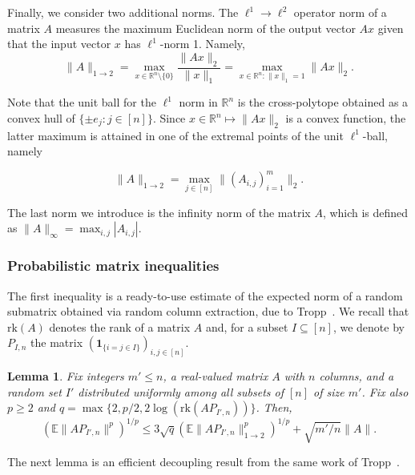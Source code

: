 \documentclass[reqno,a4paper]{amsart}
\newtheorem{lemma}[theorem]{Lemma}
\theoremstyle{definition}
\begin{document}
Finally, we consider two additional norms. The $\ell^1\to \ell^2$ operator norm of a matrix $A$ measures the maximum Euclidean norm of the output vector $Ax$ given that the input vector $x$ has $\ell^1$-norm 1. Namely,
\[\|A\|_{1 \to 2} = \max_{x \in \mathbb R^n\setminus \{0\}} \frac{\|Ax\|_2}{\|x\|_1} = \max_{x\in \mathbb R^n: \|x\|_1 = 1} \|Ax\|_2.\]

Note that the unit ball for the $\ell^1$ norm in $\mathbb R^n$ is the cross-polytope obtained as a convex hull of $\{\pm e_j\colon j\in [n]\}$. Since $x\in \mathbb R^n\mapsto \|Ax\|_2$ is a convex function, the latter maximum is attained in one of the extremal points of the unit $\ell^1$-ball, namely

\begin{equation}\label{eq:12}
\|A\|_{1 \to 2} = \max_{j\in [n]} \|(A_{i,j})_{i=1}^m\|_2.
\end{equation}

The last norm we introduce is the infinity norm of the matrix $A$, which is defined as $\|A\|_{\infty} = \max_{i,j} |A_{i,j}|$.

\subsubsection{Probabilistic matrix inequalities}
The first inequality is a ready-to-use estimate of the expected norm of a random submatrix obtained via random column extraction, due to Tropp~\cite[Theorem~23]{Tro08}.
We recall that $\text{rk}(A)$ denotes the rank of a matrix $A$ and, for a subset $I\subseteq [n]$, we denote by $P_{I,n}$ the matrix $(\mathbf{1}_{\{i=j\in I\}})_{i,j\in [n]}$.

\begin{lemma}\label{lem:compression}
Fix integers $m'\le n$, a real-valued matrix $A$ with $n$ columns, and a random set $I'$ distributed uniformly among all subsets of $[n]$ of size $m'$.
Fix also $p\ge2$ and $q=\max\{2,p/2,2\log(\mathrm{rk}(AP_{I',n}))\}$.
Then,
\begin{equation}\label{eq:compression}
        (\mathbb E \|AP_{I',n}\|^p)^{1/p}
        \le
        3\sqrt{q} (\mathbb E \|AP_{I',n}\|^p_{1\to2})^{1/p}
        +\sqrt{m'/n} \|A\|.
\end{equation}
\end{lemma}

The next lemma is an efficient decoupling result from the same work of Tropp~\cite[Theorem~9]{Tro08}.
\end{document}

